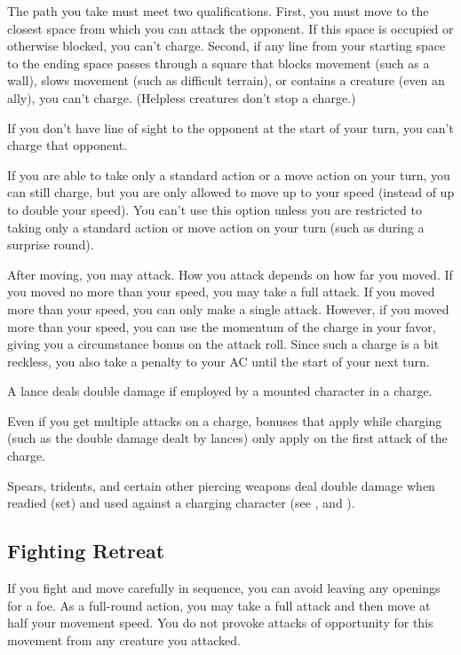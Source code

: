 The path you take must meet two qualifications. First, you must move to the closest space from which you can attack the opponent. If this space is occupied or otherwise blocked, you can't charge. Second, if any line from your starting space to the ending space passes through a square that blocks movement (such as a wall), slows movement (such as difficult terrain), or contains a creature (even an ally), you can't charge. (Helpless creatures don't stop a charge.)

If you don't have line of sight to the opponent at the start of your turn, you can't charge that opponent.

If you are able to take only a standard action or a move action on your turn, you can still charge, but you are only allowed to move up to your speed (instead of up to double your speed). You can't use this option unless you are restricted to taking only a standard action or move action on your turn (such as during a surprise round).

 After moving, you may attack. How you attack depends on how far you moved. If you moved no more than your speed, you may take a full attack. If you moved more than your speed, you can only make a single attack. However, if you moved more than your speed, you can use the momentum of the charge in your favor, giving you a  circumstance bonus on the attack roll. Since such a charge is a bit reckless, you also take a  penalty to your AC until the start of your next turn.

 A lance deals double damage if employed by a mounted character in a charge.

 Even if you get multiple attacks on a charge, bonuses that apply while charging (such as the double damage dealt by lances) only apply on the first attack of the charge.

 Spears, tridents, and certain other piercing weapons deal double damage when readied (set) and used against a charging character (see , and ).

\subsection{Fighting Retreat}
If you fight and move carefully in sequence, you can avoid leaving any openings for a foe. As a full-round action, you may take a full attack and then move at half your movement speed. You do not provoke attacks of opportunity for this movement from any creature you attacked.

